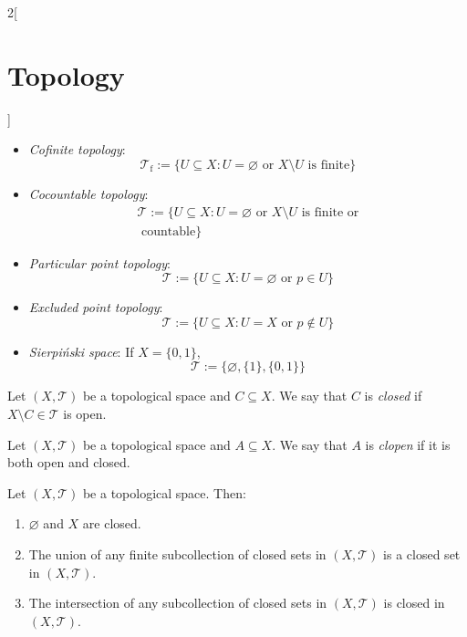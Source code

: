 \documentclass[../../../main.tex]{subfiles}
\begin{document}
\begin{multicols}{2}[\section{Topology}]
\begin{prop}
\begin{itemize}
      \item \textit{Cofinite topology}: $$\mathcal{T}_\text{f}:=\{U\subseteq X:U=\varnothing\text{ or }X\setminus U\text{ is finite}\}$$
      \item \textit{Cocountable topology}:
            \begin{multline*}
              \mathcal{T}:=\{U\subseteq X:U=\varnothing\text{ or }X\setminus U\text{ is finite or}\\\text{ countable}\}
            \end{multline*}
      \item \textit{Particular point topology}: $$\mathcal{T}:=\{U\subseteq X:U=\varnothing\text{ or }p\in U\}$$
      \item \textit{Excluded point topology}: $$\mathcal{T}:=\{U\subseteq X:U=X\text{ or }p\notin U\}$$
      \item \textit{Sierpiński space}: If $X=\{0,1\}$, $$\mathcal{T}:=\{\varnothing,\{1\},\{0,1\}\}$$
    \end{itemize}
  \end{prop}
  \begin{definition}
    Let $(X,\mathcal{T})$ be a topological space and $C\subseteq X$. We say that $C$ is \textit{closed} if $X\setminus C\in\mathcal{T}$ is open.
  \end{definition}
  \begin{definition}
    Let $(X,\mathcal{T})$ be a topological space and $A\subseteq X$. We say that $A$ is \textit{clopen} if it is both open and closed.
  \end{definition}
  \begin{prop}
    Let $(X,\mathcal{T})$ be a topological space. Then:
    \begin{enumerate}
      \item $\varnothing$ and $X$ are closed.
      \item The union of any finite subcollection of closed sets in $(X,\mathcal{T})$ is a closed set in $(X,\mathcal{T})$.
      \item The intersection of any subcollection of closed sets in $(X,\mathcal{T})$ is closed in $(X,\mathcal{T})$.
    \end{enumerate}
  \end{prop}

\end{multicols}
\end{document}
